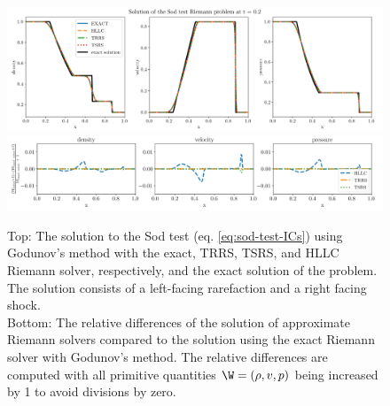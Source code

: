 \begin{figure}
    \centering
    \includegraphics[width=\textwidth]{
    ./figures/FV/godunov_euler/GODUNOV-sod_test-1D.png} %
    \includegraphics[width=\textwidth]{
    ./figures/FV/godunov_euler/GODUNOV-sod_test-differences-1D.png} %
    \caption[Sod test using Godunov's method]{
Top: The solution to the Sod test (eq. \ref{eq:sod-test-ICs}) using Godunov's method with the exact,
TRRS, TSRS, and HLLC Riemann solver, respectively, and the exact solution of the problem.
The solution consists of a left-facing rarefaction and a right facing shock. \\
Bottom: The relative differences of the solution of approximate Riemann solvers compared to the
solution using the exact Riemann solver with Godunov's method. The relative differences are
computed with all primitive quantities $\W = (\rho, v, p)$ being increased by 1 to avoid
divisions by zero.
    }%
    \label{fig:godunov-sod-test}
\end{figure}
%
